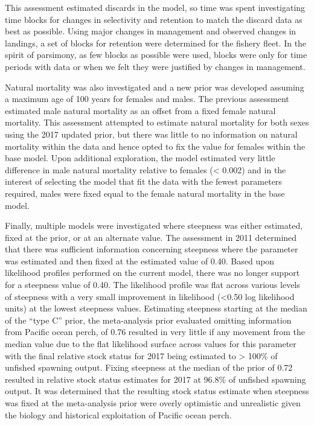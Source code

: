 \documentclass[12pt,]{article}
\begin{document}
This assessment estimated discards in the model, so time was spent
investigating time blocks for changes in selectivity and retention to
match the discard data as best as possible. Using major changes in
management and observed changes in landings, a set of blocks for
retention were determined for the fishery fleet. In the spirit of
parsimony, as few blocks as possible were used, blocks were only for
time periods with data or when we felt they were justified by changes in
management.

Natural mortality was also investigated and a new prior was developed
assuming a maximum age of 100 years for females and males. The previous
assessment estimated male natural mortality as an offset from a fixed
female natural mortality. This assessment attempted to estimate natural
mortality for both sexes using the 2017 updated prior, but there was
little to no information on natural mortality within the data and hence
opted to fix the value for females within the base model. Upon
additional exploration, the model estimated very little difference in
male natural mortality relative to females (\textless{} 0.002) and in
the interest of selecting the model that fit the data with the fewest
parameters required, males were fixed equal to the female natural
mortality in the base model.

Finally, multiple models were investigated where steepness was either
estimated, fixed at the prior, or at an alternate value. The assessment
in 2011 determined that there was sufficient information concerning
steepness where the parameter was estimated and then fixed at the
estimated value of 0.40. Based upon likelihood profiles performed on the
current model, there was no longer support for a steepness value of
0.40. The likelihood profile was flat across various levels of steepness
with a very small improvement in likelihood (\textless{}0.50 log
likelihood units) at the lowest steepness values. Estimating steepness
starting at the median of the ``type C'' prior, the meta-analysis prior
evaluated omitting information from Pacific ocean perch, of 0.76
resulted in very little if any movement from the median value due to the
flat likelihood surface across values for this parameter with the final
relative stock status for 2017 being estimated to \textgreater{} 100\%
of unfished spawning output. Fixing steepness at the median of the prior
of 0.72 resulted in relative stock status estimates for 2017 at 96.8\%
of unfished spawning output. It was determined that the resulting stock
status estimate when steepness was fixed at the meta-analysis prior were
overly optimistic and unrealistic given the biology and historical
exploitation of Pacific ocean perch.
\end{document}
